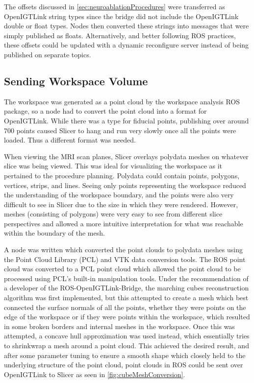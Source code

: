 \documentclass[12pt]{report}
\begin{document}
The offsets discussed in \autoref{sec:neuroablationProcedures} were transferred as OpenIGTLink string types since the bridge did not include the OpenIGTLink double or float types. Nodes then converted these strings into messages that were simply published as floats. Alternatively, and better following ROS practices, these offsets could be updated with a dynamic reconfigure server instead of being published on separate topics.

\subsection{Sending Workspace Volume}
\label{sec:sendingWorkspaceVolume}
The workspace was generated as a point cloud by the workspace analysis ROS package, so a node had to convert the point cloud into a format for OpenIGTLink. While there was a type for fiducial points, publishing over around 700 points caused Slicer to hang and run very slowly once all the points were loaded. Thus a different format was needed.

When viewing the MRI scan planes, Slicer overlays polydata meshes on whatever slice was being viewed. This was ideal for visualizing the workspace as it pertained to the procedure planning. Polydata could contain points, polygons, vertices, strips, and lines. Seeing only points representing the workspace reduced the understanding of the workspace boundary, and the points were also very difficult to see in Slicer due to the size in which they were rendered. However, meshes (consisting of polygons) were very easy to see from different slice perspectives and allowed a more intuitive interpretation for what was reachable within the boundary of the mesh.

A node was written which converted the point clouds to polydata meshes using the Point Cloud Library (PCL) and VTK data conversion tools. The ROS point cloud was converted to a PCL point cloud which allowed the point cloud to be processed using PCL's built-in manipulation tools. Under the recommendation of a developer of the ROS-OpenIGTLink-Bridge, the marching cubes reconstruction algorithm was first implemented, but this attempted to create a mesh which best connected the surface normals of all the points, whether they were points on the edge of the workspace or if they were points within the workspace, which resulted in some broken borders and internal meshes in the workspace. Once this was attempted, a concave hull approximation was used instead, which essentially tries to shrinkwrap a mesh around a point cloud. This achieved the desired result, and after some parameter tuning to ensure a smooth shape which closely held to the underlying structure of the point cloud, point clouds in ROS could be sent over OpenIGTLink to Slicer as seen in \autoref{fig:cubeMeshConversion}. 
\end{document}
